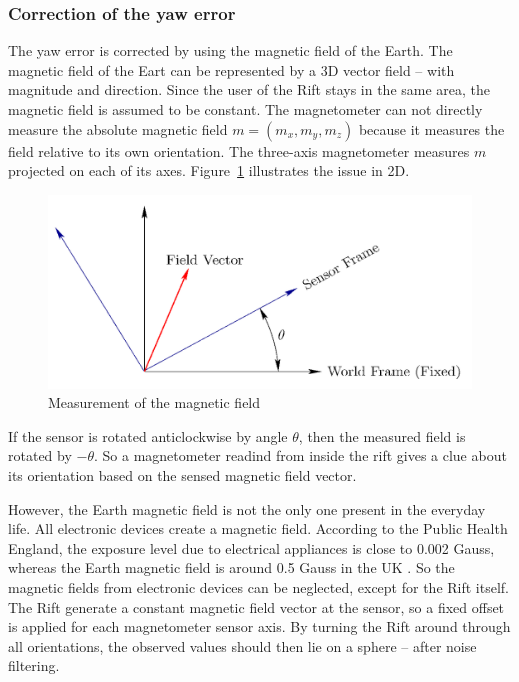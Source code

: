 \documentclass[12pt]{article}
\begin{document}
\subsubsection{Correction of the yaw error}
The yaw error is corrected by using the magnetic field of the Earth. The magnetic field of the Eart can be represented by a 3D vector field -- with magnitude and direction. Since the user of the Rift stays in the same area, the magnetic field is assumed to be constant. The magnetometer can not directly measure the absolute magnetic field $m = (m_x, m_y, m_z)$ because it measures the field relative to its own orientation. The three-axis magnetometer measures $m$ projected on each of its axes. Figure~\ref{fig:field} illustrates the issue in 2D.

\begin{figure}[h]
  \centering
  \includegraphics[scale=0.2]{RotMag.png}
  \caption{\label{fig:field} Measurement of the magnetic field}
\end{figure}

If the sensor is rotated anticlockwise by angle $\theta$, then the measured field is rotated by $-\theta$. So a magnetometer readind from inside the rift gives a clue about its orientation based on the sensed magnetic field vector.

However, the Earth magnetic field is not the only one present in the everyday life. All electronic devices create a magnetic field. According to the Public Health England, the exposure level due to electrical appliances is close to 0.002 Gauss, whereas the Earth magnetic field is around 0.5 Gauss in the UK \cite{HPA}. So the magnetic fields from electronic devices can be neglected, except for the Rift itself. The Rift generate a constant magnetic field vector at the sensor, so a fixed offset is applied for each magnetometer sensor axis. By turning the Rift around through all orientations, the observed values should then lie on a sphere -- after noise filtering.
\end{document}
